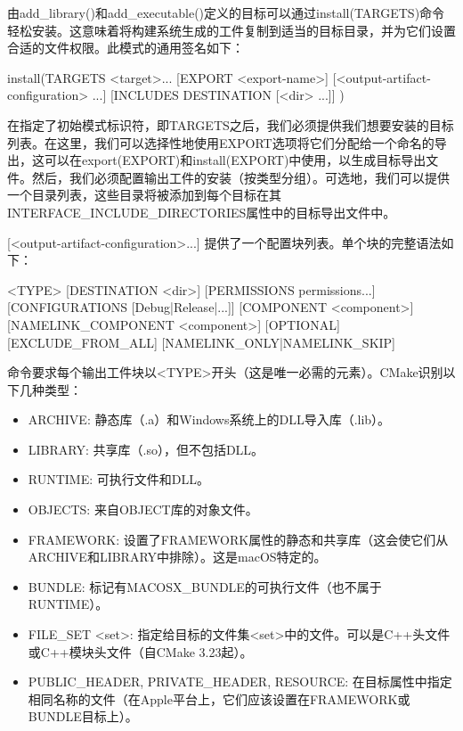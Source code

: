 
由add\_library()和add\_executable()定义的目标可以通过install(TARGETS)命令轻松安装。这意味着将构建系统生成的工件复制到适当的目标目录，并为它们设置合适的文件权限。此模式的通用签名如下：

\begin{shell}
install(TARGETS <target>... [EXPORT <export-name>]
        [<output-artifact-configuration> ...]
        [INCLUDES DESTINATION [<dir> ...]]
)
\end{shell}

在指定了初始模式标识符，即TARGETS之后，我们必须提供我们想要安装的目标列表。在这里，我们可以选择性地使用EXPORT选项将它们分配给一个命名的导出，这可以在export(EXPORT)和install(EXPORT)中使用，以生成目标导出文件。然后，我们必须配置输出工件的安装（按类型分组）。可选地，我们可以提供一个目录列表，这些目录将被添加到每个目标在其INTERFACE\_INCLUDE\_DIRECTORIES属性中的目标导出文件中。

[<output-artifact-configuration>...] 提供了一个配置块列表。单个块的完整语法如下：

\begin{shell}
<TYPE> [DESTINATION <dir>]
       [PERMISSIONS permissions...]
       [CONFIGURATIONS [Debug|Release|...]]
       [COMPONENT <component>]
       [NAMELINK_COMPONENT <component>]
       [OPTIONAL] [EXCLUDE_FROM_ALL]
       [NAMELINK_ONLY|NAMELINK_SKIP]
\end{shell}

命令要求每个输出工件块以<TYPE>开头（这是唯一必需的元素）。CMake识别以下几种类型：

\begin{itemize}
\item
ARCHIVE: 静态库（.a）和Windows系统上的DLL导入库（.lib）。

\item
LIBRARY: 共享库（.so），但不包括DLL。

\item
RUNTIME: 可执行文件和DLL。

\item
OBJECTS: 来自OBJECT库的对象文件。

\item
FRAMEWORK: 设置了FRAMEWORK属性的静态和共享库（这会使它们从ARCHIVE和LIBRARY中排除）。这是macOS特定的。

\item
BUNDLE: 标记有MACOSX\_BUNDLE的可执行文件（也不属于RUNTIME）。

\item
FILE\_SET <set>: 指定给目标的文件集<set>中的文件。可以是C++头文件或C++模块头文件（自CMake 3.23起）。

\item
PUBLIC\_HEADER, PRIVATE\_HEADER, RESOURCE: 在目标属性中指定相同名称的文件（在Apple平台上，它们应该设置在FRAMEWORK或BUNDLE目标上）。
\end{itemize}

